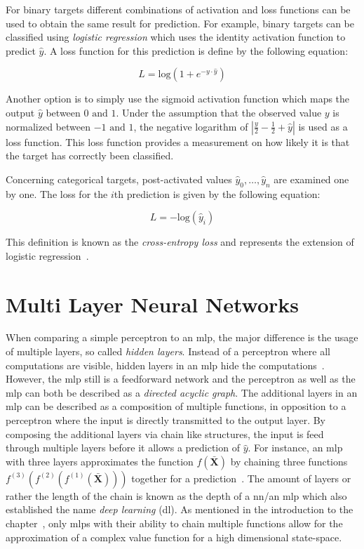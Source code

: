 \documentclass[draft,final]{vutinfth} %
\begin{document}
    For binary targets different combinations of activation and loss functions can be used to obtain the same result for prediction.
    For example, binary targets can be classified using \textit{logistic regression} which uses the identity activation function to predict $\hat{y}$.
    A loss function for this prediction is define by the following equation:

    \begin{equation}
        L=\text{log}(1+e^{-y\cdot\hat{y}})
    \end{equation}

    Another option is to simply use the sigmoid activation function which maps the output $\hat{y}$ between $0 \text{ and } 1$.
    Under the assumption that the observed value $y$ is normalized between $-1 \text{ and } 1$, the negative logarithm of $|\frac{y}{2}-\frac{1}{2}+\hat{y}|$ is used as a loss function.
    This loss function provides a measurement on how likely it is that the target has correctly been classified.

    Concerning categorical targets, post-activated values $\hat{y}_0,\ldots,\hat{y}_n$ are examined one by one.
    The loss for the $i$th prediction is given by the following equation:

    \begin{equation}
        L=-\text{log}(\hat{y}_i)
    \end{equation}

    This definition is known as the \textit{cross-entropy loss} and represents the extension of logistic regression~\citep{aggarwal_neural_2018}.


    \section{Multi Layer Neural Networks}
    When comparing a simple perceptron to an \gls{mlp}, the major difference is the usage of multiple layers, so called \textit{hidden layers}.
    Instead of a perceptron where all computations are visible, hidden layers in an \gls{mlp} hide the computations~\citep{aggarwal_neural_2018}.
    However, the \gls{mlp} still is a feedforward network and the perceptron as well as the \gls{mlp} can both be described as a \textit{directed acyclic graph}.
    The additional layers in an \gls{mlp} can be described as a composition of multiple functions, in opposition to a perceptron where the input is directly transmitted to the output layer.
    By composing the additional layers via chain like structures, the input is feed through multiple layers before it allows a prediction of $\hat{y}$.
    For instance, an \gls{mlp} with three layers approximates the function $f(\bar{\mathbf{X}})$ by chaining three functions $f^{(3)}(f^{(2)}(f^{(1)}(\bar{\mathbf{X}})))$ together for a prediction~\citep{goodfellow_deep_2016}.
    The amount of layers or rather the length of the chain is known as the depth of a \gls{nn}/an \gls{mlp} which also established the name \textit{deep learning} (\gls{dl}).
    As mentioned in the introduction to the chapter~, only \gls{mlp}s with their ability to chain multiple functions allow for the approximation of a complex value function for a high dimensional state-space.
\end{document}
